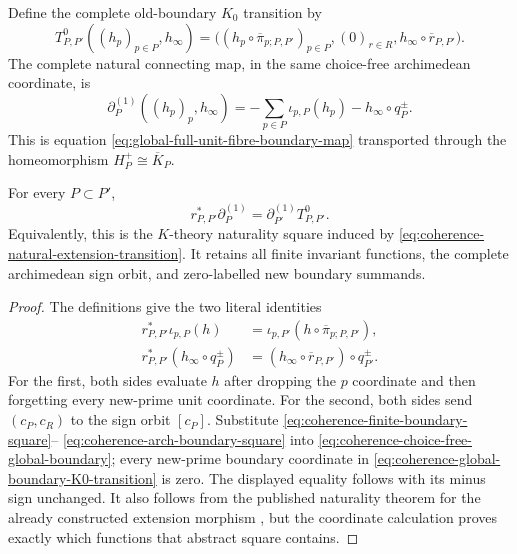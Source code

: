 Define the complete old-boundary $K_0$ transition by
\begin{equation}
 T^0_{P,P'}((h_p)_{p\in P},h_\infty)
 =\bigl((h_p\circ\overline\pi_{p;P,P'})_{p\in P},
        (0)_{r\in R},
        h_\infty\circ\overline r_{P,P'}\bigr).
 \label{eq:coherence-global-boundary-K0-transition}
\end{equation}
The complete natural connecting map, in the same choice-free archimedean
coordinate, is
\begin{equation}
 \partial_P^{(1)}((h_p)_p,h_\infty)
 =-\sum_{p\in P}\iota_{p,P}(h_p)-h_\infty\circ q_P^\pm.
 \label{eq:coherence-choice-free-global-boundary}
\end{equation}
This is equation
\eqref{eq:global-full-unit-fibre-boundary-map} transported through the
homeomorphism $H_P^+\cong\overline K_P$.

\begin{theorem}
\label{thm:coherence-connecting-square}
For every $P\subset P'$,
\begin{equation}
 r_{P,P'}^*\partial_P^{(1)}
 =\partial_{P'}^{(1)}T^0_{P,P'}.
 \label{eq:coherence-connecting-square}
\end{equation}
Equivalently, this is the $K$-theory naturality square induced by
\eqref{eq:coherence-natural-extension-transition}.  It retains all finite
invariant functions, the complete archimedean sign orbit, and zero-labelled
new boundary summands.
\end{theorem}

\begin{proof}
The definitions give the two literal identities
\begin{align}
 r_{P,P'}^*\iota_{p,P}(h)
 &=\iota_{p,P'}(h\circ\overline\pi_{p;P,P'}),
 \label{eq:coherence-finite-boundary-square}\\
 r_{P,P'}^*(h_\infty\circ q_P^\pm)
 &=(h_\infty\circ\overline r_{P,P'})\circ q_{P'}^\pm.
 \label{eq:coherence-arch-boundary-square}
\end{align}
For the first, both sides evaluate $h$ after dropping the $p$ coordinate and
then forgetting every new-prime unit coordinate.  For the second, both sides
send $(c_P,c_R)$ to the sign orbit $[c_P]$.  Substitute
\eqref{eq:coherence-finite-boundary-square}--
\eqref{eq:coherence-arch-boundary-square} into
\eqref{eq:coherence-choice-free-global-boundary}; every new-prime boundary
coordinate in \eqref{eq:coherence-global-boundary-K0-transition} is zero.
The displayed equality follows with its minus sign unchanged.  It also follows
from the published naturality theorem for the already constructed extension
morphism \cite[Definition~21.1.1 and Example~21.1.2(a)]{blackadar1986}, but
the coordinate calculation proves exactly which functions that abstract
square contains.
\end{proof}

